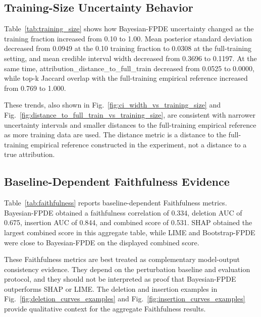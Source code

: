 \subsection{Training-Size Uncertainty Behavior}

Table~\ref{tab:training_size} shows how Bayesian-FPDE uncertainty changed as the training fraction increased from 0.10 to 1.00. Mean posterior standard deviation decreased from 0.0949 at the 0.10 training fraction to 0.0308 at the full-training setting, and mean credible interval width decreased from 0.3696 to 0.1197. At the same time, attribution\_distance\_to\_full\_train decreased from 0.0525 to 0.0000, while top-k Jaccard overlap with the full-training empirical reference increased from 0.769 to 1.000.

These trends, also shown in Fig.~\ref{fig:ci_width_vs_training_size} and Fig.~\ref{fig:distance_to_full_train_vs_training_size}, are consistent with narrower uncertainty intervals and smaller distances to the full-training empirical reference as more training data are used. The distance metric is a distance to the full-training empirical reference constructed in the experiment, not a distance to a true attribution.

\subsection{Baseline-Dependent Faithfulness Evidence}

Table~\ref{tab:faithfulness} reports baseline-dependent Faithfulness metrics. Bayesian-FPDE obtained a faithfulness correlation of 0.334, deletion AUC of 0.675, insertion AUC of 0.844, and combined score of 0.531. SHAP obtained the largest combined score in this aggregate table, while LIME and Bootstrap-FPDE were close to Bayesian-FPDE on the displayed combined score.

These Faithfulness metrics are best treated as complementary model-output consistency evidence. They depend on the perturbation baseline and evaluation protocol, and they should not be interpreted as proof that Bayesian-FPDE outperforms SHAP or LIME. The deletion and insertion examples in Fig.~\ref{fig:deletion_curves_examples} and Fig.~\ref{fig:insertion_curves_examples} provide qualitative context for the aggregate Faithfulness results.
